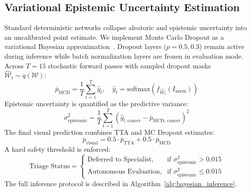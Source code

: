 \documentclass[journal]{IEEEtran}
\begin{document}
\subsection{Variational Epistemic Uncertainty Estimation}
Standard deterministic networks collapse aleatoric and epistemic uncertainty into an uncalibrated point estimate. We implement Monte Carlo Dropout as a variational Bayesian approximation~\cite{gal2016dropout}. Dropout layers ($p=0.5, 0.3$) remain active during inference while batch normalization layers are frozen in evaluation mode. Across $T=15$ stochastic forward passes with sampled dropout masks $\hat{\mathcal{W}}_t \sim q(\mathcal{W})$:
\begin{equation}
\bar{p}_{\text{MCD}} = \frac{1}{T} \sum_{t=1}^{T} \hat{y}_t, \quad \hat{y}_t = \text{softmax}\left( f_{\hat{\mathcal{W}}_t}(I_{\text{norm}}) \right)
\end{equation}
Epistemic uncertainty is quantified as the predictive variance:
\begin{equation}
\sigma_{\text{epistemic}}^2 = \frac{1}{T} \sum_{t=1}^{T} \left( \hat{y}_{t, \text{cancer}} - \bar{p}_{\text{MCD, cancer}} \right)^2
\label{eq:uncertainty}
\end{equation}
The final visual prediction combines TTA and MC Dropout estimates:
\begin{equation}
\bar{p}_{\text{visual}} = 0.5 \cdot \bar{p}_{\text{TTA}} + 0.5 \cdot \bar{p}_{\text{MCD}}
\end{equation}
A hard safety threshold is enforced:
\begin{equation}
\text{Triage Status} = \begin{cases} \text{Deferred to Specialist}, & \text{if } \sigma_{\text{epistemic}}^2 > 0.015 \\ \text{Autonomous Evaluation}, & \text{if } \sigma_{\text{epistemic}}^2 \le 0.015 \end{cases}
\end{equation}
The full inference protocol is described in Algorithm~\ref{alg:bayesian_inference}.
\end{document}
